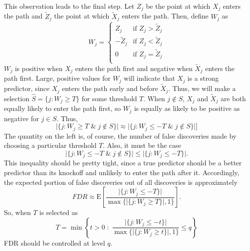 \documentclass[11pt]{article}
\newcommand{\E}{\mathrm{E}}
\theoremstyle{definition}
\begin{document}
   This observation leads to the final step. Let $Z_j$ be the point at which $X_j$ enters the path and $\tilde Z_j$ the point at which $\tilde X_j$ enters the path. Then, define $W_j$ as 
   \[ W_j = \begin{cases}   Z_j         &\mbox{if } Z_j>\tilde Z_j \\ 
                            -\tilde Z_j &\mbox{if } Z_j<\tilde Z_j \\
                            0           &\mbox{if } Z_j=\tilde Z_j \\
            \end{cases} \]
            $W_j$ is positive when $X_j$ enters the path first and negative when $\tilde X_j$ enters the path first. Large, positive values for $W_j$ will indicate that $X_j$ is a strong predictor, since $X_j$ enters the path early and before $\tilde X_j$. Thus, we will make a selection $\hat S=\{j:W_j\geq T\}$ for some threshold $T$. When $j\not\in S$, $X_j$ and $\tilde X_j$ are both equally likely to enter the path first, so $W_j$ is equally as likely to be positive as negative for $j\in S$. Thus, 
            \[ \vert\{j:W_j\geq T \; \& \; j\not\in S\}\vert \approx \vert\{j:W_j\leq -T \; \& \; j\not\in S\}\vert] \]
            The quantity on the left is, of course, the number of false discoveries made by choosing a particular threshold $T$. Also, it must be the case
            \[\vert \{j:W_j\leq -T \; \& \; j\not\in S\}\vert \leq \vert\{j:W_j\leq -T\}\vert.\]
            This inequality should be pretty tight, since a true predictor should be a better predictor than its knockoff and unlikely to enter the path after it. Accordingly, the expected portion of false discoveries out of all discoveries is approximately
            \[FDR \approx \E\left[\frac{\vert\{j:W_j\leq -T\}\vert}{\max\{\vert\{j:W_j\geq T\}\vert,1\}}\right].\] 
            So, when $T$ is selected as
            \[ T = \min\left\{ t>0 \;: \; \frac{\vert\{j:W_j\leq -t\}\vert}{\max\{\vert\{j:W_j\geq t\}\vert,1\}}\leq q \right\} \] 
            FDR should be controlled at level $q$.
\end{document}

